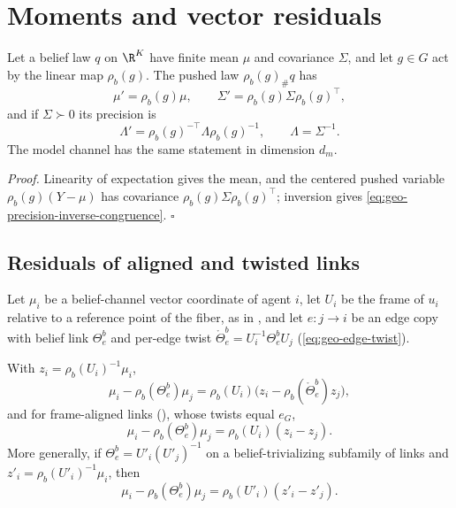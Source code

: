 \section{Moments and vector residuals}

Let a belief law \(q\) on \(\R^K\) have finite mean \(\mu\) and covariance
\(\Sigma\), and let \(g\in G\) act by the linear map \(\rho_b(g)\). The pushed
law \(\rho_b(g)_\#q\) has
\begin{equation}
\mu'=\rho_b(g)\mu,
\qquad
\Sigma'=\rho_b(g)\Sigma\rho_b(g)^\top,
\label{eq:geo-moment-pushforward}
\end{equation}
and if \(\Sigma\succ0\) its precision is
\begin{equation}
\Lambda'=\rho_b(g)^{-\top}\Lambda\rho_b(g)^{-1},
\qquad\Lambda=\Sigma^{-1}.
\label{eq:geo-precision-inverse-congruence}
\end{equation}
The model channel has the same statement in dimension \(d_m\).

\noindent\emph{Proof.}
Linearity of expectation gives the mean, and the centered pushed variable
\(\rho_b(g)(Y-\mu)\) has covariance \(\rho_b(g)\Sigma\rho_b(g)^\top\);
inversion gives \eqref{eq:geo-precision-inverse-congruence}. \(\square\)

\subsection{Residuals of aligned and twisted links}
\label{sec:geo-flatness}

Let \(\mu_i\) be a belief-channel vector coordinate of agent \(i\), let
\(U_i\) be the frame of \(u_i\) relative to a reference point of the fiber, as
in , and let \(e:j\to i\) be an edge copy
with belief link \(\Theta^b_e\) and per-edge twist
\(\mathring\Theta^b_e=U_i^{-1}\Theta^b_eU_j\) (\eqref{eq:geo-edge-twist}).

With \(z_i=\rho_b(U_i)^{-1}\mu_i\),
\begin{equation}
\mu_i-\rho_b(\Theta_e^b)\mu_j
=\rho_b(U_i)\bigl(z_i-\rho_b(\mathring\Theta_e^b)z_j\bigr),
\label{eq:geo-regime-two-residual}
\end{equation}
and for frame-aligned links (), whose twists equal
\(e_G\),
\begin{equation}
\mu_i-\rho_b(\Theta_e^b)\mu_j
=\rho_b(U_i)(z_i-z_j).
\label{eq:geo-trivialized-residual}
\end{equation}
More generally, if \(\Theta_e^b=U'_i(U'_j)^{-1}\) on a belief-trivializing
subfamily of links and \(z'_i=\rho_b(U'_i)^{-1}\mu_i\), then
\begin{equation}
\mu_i-\rho_b(\Theta_e^b)\mu_j
=\rho_b(U'_i)(z'_i-z'_j).
\label{eq:geo-subfamily-trivialized-residual}
\end{equation}


